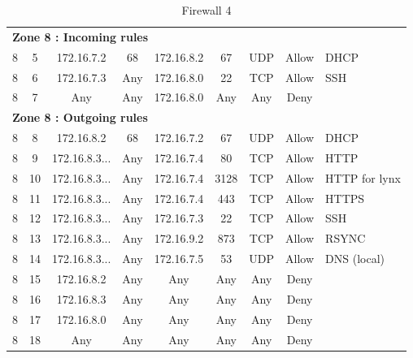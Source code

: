 \documentclass[a4paper,titlepage]{article}
\begin{document}
\begin{table}[h]
\begin{tabular}{c|c|cc|cc|ccl}
		\hline
		\multicolumn{9}{l}{\textbf{Zone 8 : Incoming rules}}\\
		8 & 5 & 172.16.7.2 & 68 &  172.16.8.2 & 67 & UDP & Allow & DHCP\\
		8 & 6 & 172.16.7.3 & Any & 172.16.8.0 & 22 & TCP & Allow & SSH \\
		8 & 7 & Any & Any & 172.16.8.0 & Any & Any & Deny & \\
		\hline
		\multicolumn{9}{l}{\textbf{Zone 8 : Outgoing rules}}\\
		8 & 8 & 172.16.8.2 & 68 & 172.16.7.2 & 67 & UDP & Allow & DHCP\\
		8 & 9 & 172.16.8.3... & Any & 172.16.7.4 & 80 & TCP & Allow & HTTP \\
		8 & 10 & 172.16.8.3... & Any & 172.16.7.4 & 3128 & TCP & Allow & HTTP for lynx\\
		8 & 11 & 172.16.8.3... & Any & 172.16.7.4 & 443 & TCP & Allow & HTTPS \\
		8 & 12 & 172.16.8.3... & Any & 172.16.7.3 & 22 & TCP & Allow & SSH \\
		8 & 13 & 172.16.8.3... & Any & 172.16.9.2 & 873 & TCP & Allow & RSYNC \\
		8 & 14 & 172.16.8.3... & Any & 172.16.7.5 & 53 & UDP & Allow & DNS (local) \\
		8 & 15 & 172.16.8.2 & Any & Any & Any & Any & Deny & \\
		8 & 16 & 172.16.8.3 & Any & Any & Any & Any & Deny & \\
		8 & 17 & 172.16.8.0 & Any & Any & Any & Any & Deny & \\
		8 & 18 & Any & Any & Any & Any & Any & Deny & \\
		\hline

	\end{tabular}
	\caption{Firewall 4}
\end{table}
\end{document}
